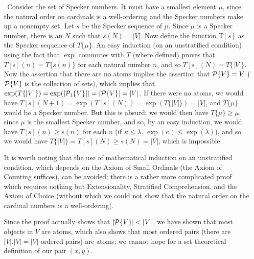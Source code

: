 \preuve\ Consider the set of Specker numbers.  It must have a smallest
element $\mu$, since the natural order on cardinals is a well-ordering and the Specker
numbers make up a nonempty set.  Let $s$ be the Specker sequence of
$\mu$.  Since $\mu$ is a Specker number, there is an $N$ such that
$s(N) = |V|$.  Now define the function T$[s]$ as the Specker sequence
of $T\{\mu\}$.  An easy induction (on an unstratified
condition) using the fact that $\exp$ commutes with $T$ (where defined)
proves that $T[s](n) = T\{s(n)\}$ for each natural number $n$, and so $T[s](N) = T\{|V|\}$.  Now the assertion that there are no atoms
implies the assertion that ${\cal P}\{V\} = V$ (${\cal P}\{V\}$ is
the collection of sets), which implies that $\exp(T\{|V|\}) =
\exp(|{\cal P}_1\{V\}|) = |{\cal P}\{V\}| = |V|$.  If there were
no atoms, we would have $T[s](N+1) = \exp(T[s](N)) =
\exp(T\{|V|\}) = |V|$, and $T\{\mu\}$ would be a Specker number.
But this is absurd; we would then have $T\{\mu\} \geq \mu$, since
$\mu$ is the smallest Specker number, and so, by an easy induction, we
would have $T[s](n) \geq s(n)$ for each $n$ (if $\kappa \leq \lambda$,
$\exp(\kappa) \leq \exp(\lambda)$), and so we would have $T\{|V|\}
= T[s](N) \geq s(N) = |V|$, which is impossible.
\finpreuve

It is worth noting that the use of mathematical
induction
on an unstratified condition, which depends on
the Axiom of Small Ordinals (the Axiom
of Counting suffices), can be avoided; there
is a rather more complicated proof which requires nothing but
Extensionality, Stratified
Comprehension, and the Axiom
of Choice (without which we could not show that
the natural order on the cardinal numbers is a
well-ordering).

Since the proof actually shows that $|{\cal P}\{V\}| < |V|$, we have
shown that most objects in $V$ are atoms, which also shows that
most ordered pairs (there are $|V|.|V| = |V|$ ordered
pairs) are atoms; we 
cannot hope for a set theoretical definition of our pair $(x,y)$.



